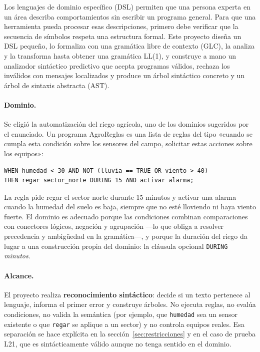 \documentclass[11pt,letterpaper]{article}
\newcommand{\T}[1]{\texttt{#1}}
\newenvironment{codigo}{\par\small\vspace{2pt}}{\par\vspace{2pt}}
\begin{document}
Los lenguajes de dominio específico (DSL) permiten que una persona experta en un área describa
comportamientos sin escribir un programa general. Para que una herramienta pueda procesar esas
descripciones, primero debe verificar que la secuencia de símbolos respeta una estructura formal. Este
proyecto diseña un DSL pequeño, lo formaliza con una gramática libre de contexto (GLC), la analiza y la
transforma hasta obtener una gramática LL(1), y construye a mano un analizador sintáctico predictivo que
acepta programas válidos, rechaza los inválidos con mensajes localizados y produce un árbol sintáctico
concreto y un árbol de sintaxis abstracta (AST).

\paragraph{Dominio.} Se eligió la automatización del riego agrícola, uno de los dominios sugeridos por el
enunciado. Un programa AgroReglas es una lista de reglas del tipo «cuando se cumpla esta condición sobre los
sensores del campo, solicitar estas acciones sobre los equipos»:

\begin{codigo}
\begin{verbatim}
WHEN humedad < 30 AND NOT (lluvia == TRUE OR viento > 40)
THEN regar sector_norte DURING 15 AND activar alarma;
\end{verbatim}
\end{codigo}

La regla pide regar el sector norte durante 15 minutos y activar una alarma cuando la humedad del suelo
es baja, siempre que no esté lloviendo ni haya viento fuerte. El dominio es adecuado porque las condiciones
combinan comparaciones con conectores lógicos, negación y agrupación ---lo que obliga a resolver
precedencia y ambigüedad en la gramática---, y porque la duración del riego da lugar a una construcción propia
del dominio: la cláusula opcional \T{DURING} \textit{minutos}.

\paragraph{Alcance.} El proyecto realiza \textbf{reconocimiento sintáctico}: decide si un texto pertenece al
lenguaje, informa el primer error y construye árboles. No ejecuta reglas, no evalúa condiciones, no valida
la semántica (por ejemplo, que \T{humedad} sea un sensor existente o que \T{regar} se aplique a un sector) y
no controla equipos reales. Esa separación se hace explícita en la sección~\ref{sec:restricciones} y en el
caso de prueba L21, que es sintácticamente válido aunque no tenga sentido en el dominio.
\end{document}
